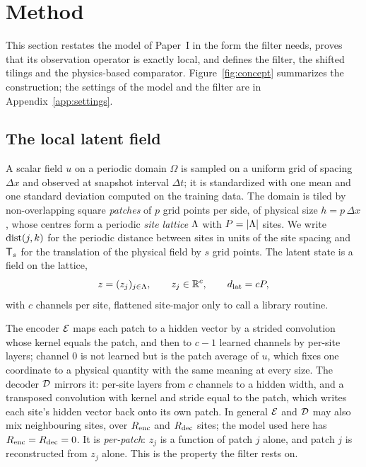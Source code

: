 \section{Method}
\label{sec:method}

This section restates the model of Paper~I in the form the filter needs,
proves that its observation operator is exactly local, and defines the
filter, the shifted tilings and the physics-based comparator.
Figure~\ref{fig:concept} summarizes the construction; the settings of the
model and the filter are in Appendix~\ref{app:settings}.

\subsection{The local latent field}
\label{sec:local_field}

 A scalar field $u$ on a periodic domain
$\Omega$ is sampled on a uniform grid of spacing $\Delta x$ and observed
at snapshot interval $\Delta t$; it is standardized with one mean and one
standard deviation computed on the training data. The domain is tiled by
non-overlapping square \emph{patches} of $p$ grid points per side, of
physical size $h=p\,\Delta x$, whose centres form a periodic \emph{site
lattice} $\Lambda$ with $P=|\Lambda|$ sites. We write $\operatorname{dist}(j,k)$ for the
periodic distance between sites in units of the site spacing and $\mathsf{T}_s$
for the translation of the physical field by $s$ grid points. The latent
state is a field on the lattice,
\begin{equation}
  z = (z_j)_{j\in\Lambda}, \qquad z_j \in \mathbb{R}^{c},
  \qquad d_{\mathrm{lat}} = cP,
  \label{eq:latent_field}
\end{equation}
with $c$ channels per site, flattened site-major only to call a library
routine.

 The encoder $\mathcal{E}$ maps each patch to a
hidden vector by a strided convolution whose kernel equals the patch, and
then to $c-1$ learned channels by per-site layers; channel $0$ is not
learned but is the patch average of $u$, which fixes one coordinate to a
physical quantity with the same meaning at every size. The decoder $\mathcal{D}$
mirrors it: per-site layers from $c$ channels to a hidden width, and a
transposed convolution with kernel and stride equal to the patch, which
writes each site's hidden vector back onto its own patch. In general
$\mathcal{E}$ and $\mathcal{D}$ may also mix neighbouring sites, over $R_{\mathrm{enc}}$ and $R_{\mathrm{dec}}$
sites; the model used here has $R_{\mathrm{enc}}=R_{\mathrm{dec}}=0$. It is \emph{per-patch}:
$z_j$ is a function of patch $j$ alone, and patch $j$ is reconstructed
from $z_j$ alone. This is the property the filter rests on.

